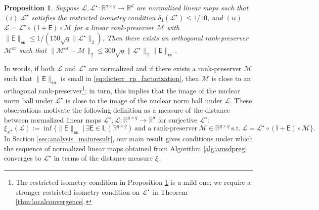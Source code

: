 \documentclass[11pt,letterpaper]{article}
\newtheorem{proposition}[theorem]{Proposition}
\newcommand{\R}{\mathbb{R}}
\renewcommand{\L}{\mathcal{L}}
\newcommand{\botimes}{\boldsymbol \otimes}
\newcommand{\ca}{\mathcal{A}}
\newcommand{\sfe}{\mathsf{E}}
\newcommand{\sfi}{\mathsf{I}}
\newcommand{\eu}{\mathsf{eu}}
\begin{document}

\begin{proposition} \label{thm:normalizednearothogonal}
Suppose $\L, \L^\star : \R^{q \times q} \rightarrow \R^d$ are normalized linear maps such that $(i)$ $\L^\star$ satisfies the restricted isometry condition $\delta_1(\L^\star) \leq 1/10$, and $(ii)$ $\L = \L^\star \circ (\sfi + \sfe) \circ \mathcal{M}$ for a linear rank-preserver $\mathcal{M}$ with $\|\sfe\|_{\eu} \leq 1 / (150 \sqrt{q} \|\L^\star\|_2)$.  Then there exists an orthogonal rank-preserver $\mathcal{M}^{\mathrm{or}}$ such that $\|\mathcal{M}^{\mathrm{or}} - \mathcal{M}\|_2 \leq 300 \sqrt{q} \|\L^\star\|_2 \|\sfe\|_{\eu}$.
\end{proposition}

In words, if both $\L$ and $\L^\star$ are normalized and if there exists a rank-preserver $\mathcal{M}$ such that $\|\sfe\|_{\eu}$ is small in \eqref{eq:dicterr_rp_factorization}, then $\mathcal{M}$ is close to an orthogonal rank-preserver\footnote{The restricted isometry condition in Proposition \ref{thm:normalizednearothogonal} is a mild one; we require a stronger restricted isometry condition on $\L^\star$ in Theorem \ref{thm:localconvergence}.}; in turn, this implies that the image of the nuclear norm ball under $\L^\star$ is close to the image of the nuclear norm ball under $\L$.  These observations motivate the following definition as a measure of the distance between normalized linear maps $\L^\star, \L : \R^{q \times q} \rightarrow \R^d$ for surjective $\L^\star$:
\begin{equation} \label{eq:defn_distancebetweendicts}
\xi_{\L^\star}(\L) := \inf\{\|\sfe\|_{\eu} ~|~ \exists \sfe  \in \mathbb{L}(\R^{q \times q}) ~\text{and a rank-preserver}~ \mathcal{M} \in \R^{q \times q} ~\text{s.t.}~ \L = \L^\star \circ (\sfi + \sfe) \circ \mathcal{M} \}.
\end{equation}
In Section \ref{sec:analysis_mainresult}, our main result gives conditions under which the sequence of normalized linear maps obtained from Algorithm \ref{alg:amsdpreg} converges to $\L^\star$ in terms of the distance measure $\xi$.

\end{document}
